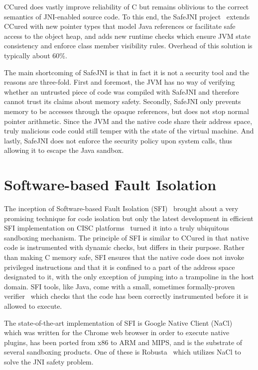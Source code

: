 \documentclass[a4paper,12pt,twoside,openright]{report}
\begin{document}
CCured does vastly improve reliability of C but remains oblivious to the correct semantics of JNI-enabled source code. To this end, the SafeJNI project~\cite{Tan06safejava} extends CCured with new pointer types that model Java references or facilitate safe access to the object heap, and adds new runtime checks which ensure JVM state consistency and enforce class member visibility rules. Overhead of this solution is typically about 60\%.

The main shortcoming of SafeJNI is that in fact it is not a security tool and the reasons are three-fold. First and foremost, the JVM has no way of verifying whether an untrusted piece of code was compiled with SafeJNI and therefore cannot trust its claims about memory safety. Secondly, SafeJNI only prevents memory to be accesses through the opaque references, but does not stop normal pointer arithmetic. Since the JVM and the native code share their address space, truly malicious code could still temper with the state of the virtual machine. And lastly, SafeJNI does not enforce the security policy upon system calls, thus allowing it to escape the Java sandbox.

\section{Software-based Fault Isolation}

The inception of Software-based Fault Isolation (SFI)~\cite{Wahbe:1993:ESF:168619.168635} brought about a very promising technique for code isolation but only the latest development in efficient SFI implementation on CISC platforms~\cite{McCamant:2006:ESC:1267336.1267351} turned it into a truly ubiquitous sandboxing mechanism. The principle of SFI is similar to CCured in that native code is instrumented with dynamic checks, but differs in their purpose. Rather than making C memory safe, SFI ensures that the native code does not invoke privileged instructions and that it is confined to a part of the address space designated to it, with the only exception of jumping into a trampoline in the host domain. SFI tools, like Java, come with a small, sometimes formally-proven verifier~\cite{Morrisett:2012:RBF:2254064.2254111} which checks that the code has been correctly instrumented before it is allowed to execute.

The state-of-the-art implementation of SFI is Google Native Client (NaCl)~\cite{5207638} which was written for the Chrome web browser in order to execute native plugins, has been ported from x86 to ARM and MIPS, and is the substrate of several sandboxing products. One of these is Robusta~\cite{siefers2010robusta} which utilizes NaCl to solve the JNI safety problem. 
\end{document}
